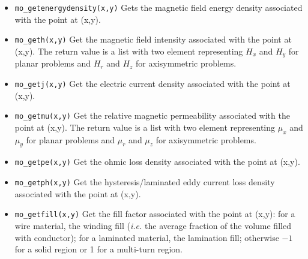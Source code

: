 \begin{itemize}
\item{\tt mo\_getenergydensity(x,y)} Gets the magnetic field energy density associated with the point at (x,y).

\item{\tt mo\_geth(x,y)} Get the magnetic field intensity associated with the point at (x,y).
The return value is a list with two element representing $H_x$ and
$H_y$ for planar problems and $H_r$ and $H_z$ for axisymmetric
problems.

\item{\tt mo\_getj(x,y)} Get the electric current density associated with the point at (x,y).

\item{\tt mo\_getmu(x,y)} Get the relative magnetic permeability associated with the point at (x,y).
The return value is a list with two element representing $\mu_x$ and
$\mu_y$ for planar problems and $\mu_r$ and $\mu_z$ for axisymmetric
problems.

\item{\tt mo\_getpe(x,y)} Get the ohmic loss density associated with the point at (x,y).

\item{\tt mo\_getph(x,y)} Get the hysteresis/laminated eddy current loss density associated with the point at (x,y).

\item{\tt mo\_getfill(x,y)} Get the fill factor associated with the point at (x,y): for a wire material, the winding fill ({\em i.e.} the average fraction of the volume filled with conductor); for a laminated material, the lamination fill; otherwise $-1$ for a solid region or 1 for a multi-turn region.


\end{itemize}
